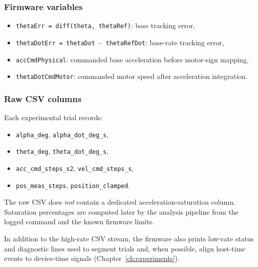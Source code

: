 \subsubsection*{Firmware variables}
\begin{itemize}
  \item \texttt{thetaErr = diff(theta, thetaRef)}: base tracking error,
  \item \texttt{thetaDotErr = thetaDot - thetaRefDot}: base-rate tracking error,
  \item \texttt{accCmdPhysical}: commanded base acceleration before motor-sign mapping,
  \item \texttt{thetaDotCmdMotor}: commanded motor speed after acceleration integration.
\end{itemize}

\subsubsection*{Raw CSV columns}
Each experimental trial records:
\begin{itemize}
  \item \texttt{alpha\_deg}, \texttt{alpha\_dot\_deg\_s},
  \item \texttt{theta\_deg}, \texttt{theta\_dot\_deg\_s},
  \item \texttt{acc\_cmd\_steps\_s2}, \texttt{vel\_cmd\_steps\_s},
  \item \texttt{pos\_meas\_steps}, \texttt{position\_clamped}.
\end{itemize}
The raw CSV does \emph{not} contain a dedicated acceleration-saturation column. Saturation percentages are computed later by the analysis pipeline from the logged command and the known firmware limits.

In addition to the high-rate CSV stream, the firmware also prints low-rate status and diagnostic lines used to segment trials and, when possible, align host-time events to device-time signals (Chapter~\ref{ch:experiments}).
